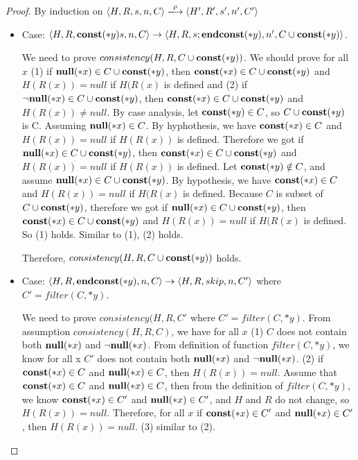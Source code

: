 \begin{proof}
  By induction on \(\langle H, R, s, n, C \rangle
  \xlongrightarrow{\rho} \langle H', R', s', n', C'\rangle \)
 \begin{itemize}
    
  \item Case: \(\langle H, R, \mathbf{const}(*y) s, n, C \rangle \rightarrow
    \langle H, R, s;\mathbf{endconst}(*y), n', C \cup {\mathbf{const}(*y)} \rangle \).

    We need to prove \(consistency(H, R, C \cup {\mathbf{const}(*y)})\). We
    should prove for all \(x\) (1) if \({\bf null}(*x) \in C\cup\mathbf{const}(*y)\),
    then \(\mathbf{const}(*x) \in C\cup\mathbf{const}(*y)\) and \(H(R(x)) = null\) if
    \(H(R(x)\) is defined and (2) if \(\neg{\bf null}(*x) \in C\cup\mathbf{const}(*y)\),
    then \(\mathbf{const}(*x) \in C\cup\mathbf{const}(*y)\) and \(H(R(x)) \ne
    null\). By case analysis, let \(\mathbf{const}(*y) \in C\), so
    \(C\cup\mathbf{const}(*y)\) is C. Assuming \({\bf null}(*x) \in C\). By
    hyphothesis, we have \(\mathbf{const}(*x) \in C\) and \(H(R(x)) = null\)
    if \(H(R(x))\) is defined. Therefore we got if \({\bf null}(*x) \in
    C\cup\mathbf{const}(*y)\), then \(\mathbf{const}(*x) \in C\cup\mathbf{const}(*y)\) and
    \(H(R(x)) = null\) if \(H(R(x))\) is defined. Let \(\mathbf{const}(*y)
    \notin C\), and assume \({\bf null}(*x) \in C\cup\mathbf{const}(*y)\). By
    hypothesis, we have \(\mathbf{const}(*x) \in C\) and \(H(R(x)) = null\) if
    \(H(R(x)\) is defined. Because \(C\) is subset of \(C \cup
    \mathbf{const}(*y)\), therefore we got if \({\bf null}(*x) \in C\cup\mathbf{const}(*y)\),
    then \(\mathbf{const}(*x) \in C\cup\mathbf{const}(*y)\) and \(H(R(x)) = null\) if
    \(H(R(x)\) is defined. So (1) holds. Similar to (1), (2) holds. 
                 
    Therefore, \(consistency(H, R, C \cup {\mathbf{const}(*y)})\) holds.

\item Case: \(\langle H, R, \mathbf{endconst}(*y), n, C \rangle \rightarrow
    \langle H, R, skip, n, C'\rangle \) where \(C' = filter(C, *y)\).

    We need to prove \(consistency(H, R, C'\) where \(C' = filter(C,
    *y)\). From assumption \(consistency(H, R, C)\), we have for all
    \(x\) (1) \(C\) does not contain both \({\bf null}(*x)\) and
    \(\neg{\bf null}(*x)\). From definition of function \(filter(C, *y)\), we
    know for all x \(C'\) does not contain both \({\bf null}(*x)\) and
    \(\neg{\bf null}(*x)\). (2) if \(\mathbf{const}(*x) \in C\) and \({\bf null}(*x) \in C\),
    then \(H(R(x)) = null\). Assume that \(\mathbf{const}(*x) \in C\) and
    \({\bf null}(*x) \in C\), then from the definition of \(filter(C, *y)\),
    we know \(\mathbf{const}(*x) \in C'\) and \({\bf null}(*x) \in C'\), and \(H\) and
    \(R\) do not change, so \(H(R(x)) = null\). Therefore, for all
    \(x\) if \(\mathbf{const}(*x) \in C'\) and \({\bf null}(*x) \in C'\), then
    \(H(R(x)) = null\). (3) similar to (2).
                 

\end{itemize}
\end{proof}
